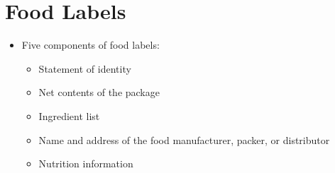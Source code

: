\documentclass[title={Chapter 2}]{fdsn201notes}
\begin{document}
\section{Food Labels}\label{sec:food-labels}
\begin{itemize}
	\item Five components of food labels:
	\begin{itemize}
		\item Statement of identity
		\item Net contents of the package
		\item Ingredient list
		\item Name and address of the food manufacturer, packer, or distributor
		\item Nutrition information
	\end{itemize}
\end{itemize}
\end{document}
